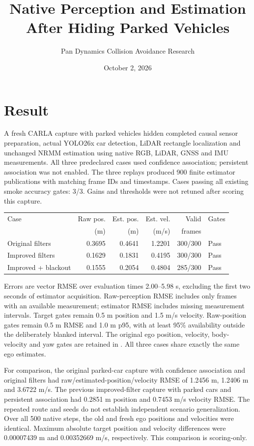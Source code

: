 \documentclass[11pt]{article}
\title{Native Perception and Estimation After Hiding Parked Vehicles}
\author{Pan Dynamics Collision Avoidance Research}
\date{October 2, 2026}
\begin{document}
\maketitle

\section{Result}
A fresh CARLA capture with parked vehicles hidden completed causal sensor
preparation, actual YOLO26x car detection, LiDAR rectangle localization and
unchanged NRMM estimation using native RGB, LiDAR, GNSS and IMU measurements.
All three predeclared cases used confidence association; persistent association
was not enabled. The three replays produced 900 finite estimator publications
with matching frame IDs and timestamps. Cases passing all existing smoke
accuracy gates: 3/3. Gains and thresholds were not retuned
after scoring this capture.

\begin{center}
\small
\begin{tabular}{@{}lrrrrl@{}}
\toprule
Case & Raw pos. & Est. pos. & Est. vel. & Valid & Gates \\
 & (m) & (m) & (m/s) & frames & \\
\midrule
Original filters & 0.3695 & 0.4641 & 1.2201 & 300/300 & Pass \\
Improved filters & 0.1629 & 0.1831 & 0.4195 & 300/300 & Pass \\
Improved + blackout & 0.1555 & 0.2054 & 0.4804 & 285/300 & Pass \\
\bottomrule
\end{tabular}
\end{center}

Errors are vector RMSE over evaluation times 2.00--5.98 s, excluding the
first two seconds of estimator acquisition. Raw-perception RMSE includes
only frames with an available measurement; estimator RMSE includes missing
measurement intervals. Target gates remain 0.5 m position and 1.5 m/s velocity.
Raw-position gates remain 0.5 m RMSE and 1.0 m p95, with at least 95\%
availability outside the deliberately blanked interval. The original ego
position, velocity, body-velocity and yaw gates are retained in
. All three cases share exactly the same ego estimates.

For comparison, the original parked-car capture with confidence association
and original filters had raw/estimated-position/velocity RMSE of
1.2456 m, 1.2406 m and 3.6722 m/s. The previous improved-filter
capture with parked cars and persistent association had 0.2851 m position
and 0.7453 m/s velocity RMSE. The repeated route and seeds do not establish
independent scenario generalization. Over all 500 native steps, the old and
fresh ego positions and velocities were identical. Maximum absolute target
position and velocity differences were 0.00007439 m and 0.00352669
m/s, respectively. This comparison is scoring-only.
\end{document}
